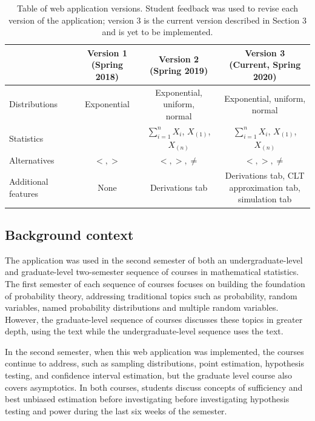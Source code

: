 \documentclass{TISE}
\begin{document}
\begin{table}[H]
	\centering
	\begin{tabular}{|l|c|c|c|}
	\hline
	\thead{} & \thead{Version 1 \\ (Spring 2018)} & \thead{Version 2 \\ (Spring 2019)} & \thead{Version 3 \\ (Current, Spring 2020)} \\
	\hline
	Distributions & Exponential & \makecell{Exponential, uniform, \\ normal} & \makecell{Exponential, uniform, \\ normal} \\
	Statistics & \makecell{$\sum_{i=1}^n X_i$, $X_{(1)}$} & $\sum_{i=1}^n X_i$, $X_{(1)}$, $X_{(n)}$ & $\sum_{i=1}^n X_i$, $X_{(1)}$, $X_{(n)}$ \\[5mm]
	Alternatives & $<, >$ & $<, >, \neq$ & $<, >, \neq$ \\
	Additional features & None & Derivations tab & \makecell{Derivations tab, CLT \\ approximation tab, \\ simulation tab}\\
	\hline
	\end{tabular}
	\caption{Table of web application versions. Student feedback was used to revise each version of the application; version 3 is the current version described in Section 3 and is yet to be implemented.}
\end{table}

\subsection{Background context}

The application was used in the second semester of both an undergraduate-level and graduate-level two-semester sequence of courses in mathematical statistics. The first semester of each sequence of courses focuses on building the foundation of probability theory, addressing traditional topics such as probability, random variables, named probability distributions and multiple random variables. However, the graduate-level sequence of courses discusses these topics in greater depth, using the \cite{casella2002} text while the undergraduate-level sequence uses the \cite{wackerly2008} text. 

In the second semester, when this web application was implemented, the courses continue to address, such as sampling distributions, point estimation, hypothesis testing, and confidence interval estimation, but the graduate level course also covers asymptotics. In both courses, students discuss concepts of sufficiency and best unbiased estimation before investigating before investigating hypothesis testing and power during the last six weeks of the semester. 
\end{document}
